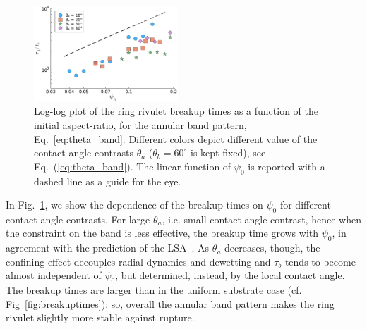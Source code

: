 \documentclass[twoside,twocolumn,9pt]{article}
\begin{document}
\begin{figure}
    \centering
    \includegraphics[width=0.48\textwidth]{Figure_6.pdf}
    \caption{Log-log plot of the ring rivulet breakup times as a function of the initial aspect-ratio, for the annular band pattern, Eq.~\ref{eq:theta_band}.
    Different colors depict different value of the contact angle contrasts $\theta_a$ ($\theta_b = 60^{\circ}$ is kept fixed), see Eq.~(\ref{eq:theta_band}).
    The linear function of $\psi_0$ is reported with a dashed line as a guide for the eye.
    }
    \label{fig:bandBreakupT}
\end{figure}
In Fig.~\ref{fig:bandBreakupT}, we show the dependence of the breakup times on $\psi_0$ for different contact angle contrasts. 
For large $\theta_a$, i.e. small contact angle contrast, hence when the constraint on the band is less effective, the breakup time grows with $\psi_0$, in agreement with the prediction of the LSA~\cite{gonzalezStabilityLiquidRing2013}. 
As $\theta_a$ decreases, though, the confining effect decouples radial dynamics and dewetting and $\tau_b$ tends to become almost independent of $\psi_0$, but determined, instead, by the local contact angle. 
The breakup times are larger than in the uniform substrate case (cf. Fig~\ref{fig:breakuptimes}): so, overall the annular band pattern makes the ring rivulet slightly more stable against rupture.
\end{document}
